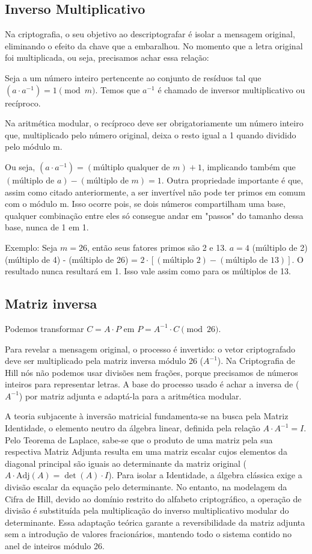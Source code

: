 \documentclass[a4paper,12pt,twocolumn]{article}
\begin{document}
\subsection{Inverso Multiplicativo}
Na criptografia, o seu objetivo ao descriptografar é isolar a mensagem original, eliminando o efeito da chave que a embaralhou. No momento que a letra original foi multiplicada, ou seja, precisamos achar essa relação:

Seja a um número inteiro pertencente ao conjunto de resíduos tal que $( a \cdot a^{-1}) = 1 \pmod m$. Temos que $a^{-1}$ é chamado de inversor multiplicativo ou recíproco.

Na aritmética modular, o recíproco deve ser obrigatoriamente um número inteiro que, multiplicado pelo número original, deixa o resto igual a 1 quando dividido pelo módulo m.

Ou seja, $( a \cdot a^{-1}) = (\text{múltiplo qualquer de } m) + 1$, implicando também que $(\text{múltiplo de } a) - (\text{múltiplo de } m) = 1$. Outra propriedade importante é que, assim como citado anteriormente, a ser invertível não pode ter primos em comum com o módulo m. Isso ocorre pois, se dois números compartilham uma base, qualquer combinação entre eles só consegue andar em "passos" do tamanho dessa base, nunca de 1 em 1.

Exemplo: Seja $m = 26$, então seus fatores primos são 2 e 13.
$a = 4$ (múltiplo de 2)
(múltiplo de 4) - (múltiplo de 26) = $2 \cdot [(\text{múltiplo } 2) - (\text{múltiplo de } 13)]$. O resultado nunca resultará em 1. Isso vale assim como para os múltiplos de 13.

\subsection{Matriz inversa}
Podemos transformar $C = A \cdot P$ em $P = A^{-1} \cdot C \pmod{26}$.

Para revelar a mensagem original, o processo é invertido: o vetor criptografado deve ser multiplicado pela matriz inversa módulo 26 ($A^{-1}$). Na Criptografia de Hill nós não podemos usar divisões nem frações, porque precisamos de números inteiros para representar letras. A base do processo usado é achar a inversa de ($A^{-1}$) por matriz adjunta e adaptá-la para a aritmética modular.

A teoria subjacente à inversão matricial fundamenta-se na busca pela Matriz Identidade, o elemento neutro da álgebra linear, definida pela relação $A \cdot A^{-1} = I$. Pelo Teorema de Laplace, sabe-se que o produto de uma matriz pela sua respectiva Matriz Adjunta resulta em uma matriz escalar cujos elementos da diagonal principal são iguais ao determinante da matriz original ($A \cdot \text{Adj}(A) = \det(A) \cdot I$). Para isolar a Identidade, a álgebra clássica exige a divisão escalar da equação pelo determinante. No entanto, na modelagem da Cifra de Hill, devido ao domínio restrito do alfabeto criptográfico, a operação de divisão é substituída pela multiplicação do inverso multiplicativo modular do determinante. Essa adaptação teórica garante a reversibilidade da matriz adjunta sem a introdução de valores fracionários, mantendo todo o sistema contido no anel de inteiros módulo 26.
\end{document}
